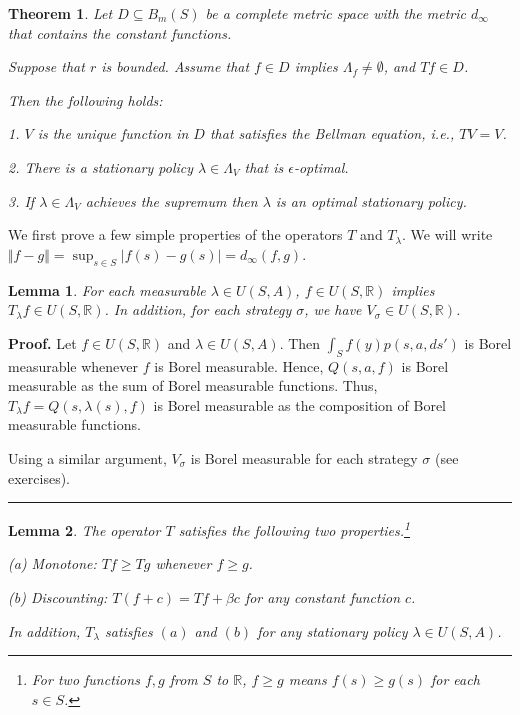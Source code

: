 \documentclass[letter,11pt]{article}
\newtheorem{theorem}{Theorem}[section]
\newtheorem{lemma}{Lemma}[section]
\newenvironment {proof}[1][Proof]{\noindent \textbf {#1.} }{\ \rule {0.5em}{0.5em}}
\begin{document}
\begin{theorem} \label{Thm:mainDP} Let $D \subseteq B_{m}(S)$ be a complete metric space with the metric $d_{\infty}$ that contains the constant functions. 

Suppose that $r$ is bounded. Assume that $f \in D$ implies $\Lambda_{f} \neq \emptyset$, and $Tf \in D$.  

Then the following holds: 

1. $V$ is the unique function in $D$ that satisfies the Bellman equation, i.e., $TV = V$.


2. There is a stationary policy $\lambda \in \Lambda_{V}$ that is $\epsilon$-optimal. 

3. If $\lambda \in \Lambda_{V}$ achieves the supremum then $\lambda$ is an optimal stationary policy. 

\end{theorem}


We first prove a few simple properties of the operators $T$ and $T_{\lambda}$. We will write $\Vert f - g \Vert = \sup _{s \in S} |f(s) - g(s) | = d_{\infty} (f,g)$. 



\begin{lemma} \label{lemma:T-lambda-closed}
     For each measurable $\lambda \in U(S,A)$, $f \in U(S,\mathbb{R})$ implies $T_{\lambda}f \in U(S,\mathbb{R})$. In addition, for each strategy $\sigma$, we have $V_{\sigma} \in U(S,\mathbb{R})$.   
\end{lemma}
\begin{proof}
Let $f \in U(S,\mathbb{R})$ and $\lambda \in U(S,A)$. Then 
 $\int _{S} f(y) p(s,a,ds')$ is Borel measurable whenever $f$ is Borel measurable. Hence,  $Q(s,a,f) $ is Borel measurable as the sum of Borel measurable functions. Thus, $T_{\lambda}f = Q(s,\lambda(s),f)  $ is Borel measurable as the composition of  Borel measurable functions. 

Using a similar argument, $V_{\sigma}$ is Borel measurable for each strategy  $\sigma$ (see exercises). 
\end{proof}

\begin{lemma} \label{lemm:Tf-prop}
The operator $T$ satisfies the following two properties.\footnote{For two functions $f,g$ from $S$ to $\mathbb{R}$, $f \geq g$ means $f(s) \geq g(s)$ for each $s \in S$. }

(a) Monotone: $Tf \geq Tg$ whenever $f \geq g$. 

(b) Discounting: $T(f+c) = Tf + \beta c$ for any constant function $c$. 

In addition, $T_{\lambda}$ satisfies $(a)$ and $(b)$ for any stationary policy $\lambda \in U(S,A)$. 
\end{lemma}
\end{document}

